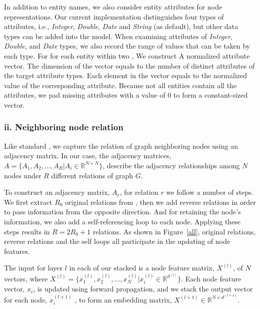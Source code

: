 	
    In addition to entity names, we also consider entity attributes for node representations.
	Our current implementation distinguishes four types of attributes, i.e., \emph{Integer}, \emph{Double}, \emph{Date} and \emph{String}
    (as default), but other data types can be added into the model. When examining attributes of \emph{Integer}, \emph{Double}, and \emph{Date} types,
    we also record the range of values that can be taken by each type.
%	
	For for each entity within two \KGs, We construct A normalized attribute vector. The dimension of the vector equals to the number of distinct attributes of the target attribute types.
	Each element in the vector equals to the normalized value of the corresponding attribute.
    Because not all entities contain all the attributes, we pad missing attributes with a value of 0 to form a constant-sized vector.

 \subsubsection{ii. Neighboring node relation}
 Like standard \RGCNs, we capture the relation of graph neighboring nodes using an adjacency matrix.
 In our case, the adjacency matrices, $A=\{A_1,A_2,...,A_R |A_i \in \mathbb{R}^{N
 \times N} \}$, describe the adjacency relationships among $N$ nodes under $R$ different relations of graph $G$.

 To construct an adjacency matrix, $A_r$, for relation $r$ we follow a number of steps. We first extract $R_0$ original
 relations from \KGs, then we add reverse relations in order to pass information from the opposite direction. And for retaining the node's information, we also add a self-referencing loop to each node. Applying these steps results in $R=2R_0+1$ relations. As shown in Figure~\ref{all}, original relations, reverse relations and the self loops all participate in the updating of node features.

 The input for layer $l$ in each of our stacked \RGCNs is a node feature matrix, $X^{(l)}$, of $N$ vectors, where  $X^{(l)} =\{x^{(l)}_1,x^{(l)}_2,...,x^{(l)}_{N}
 |x^{(l)}_{i} \in \mathbb{R}^{d^{(l)}}\}$. Each node feature vector, $x_i$, is updated using forward propagation, and we stack the output vector for each node, $x_i^{(l+1)}$
 , to form an embedding matrix, $X^{(l+1)} \in \mathbb{R}^{N \times d^{(l+1)}}$.

